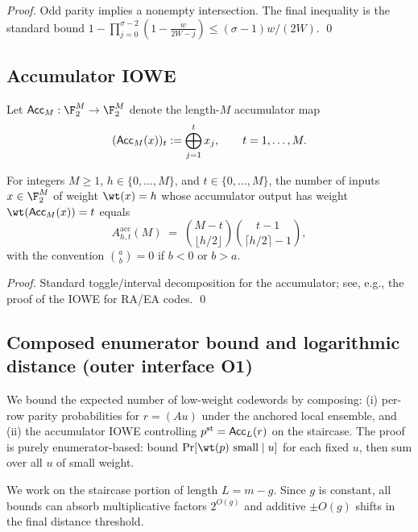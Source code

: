\begin{proof}
Odd parity implies a nonempty intersection. The final inequality is the standard bound
$1-\prod_{j=0}^{\sigma-2}(1-\frac{w}{2W-j})\le (\sigma-1)w/(2W)$. \qed
\end{proof}

\subsection{Accumulator IOWE}
\label{subsec:outer-ea-acc-enum}

Let ${\sf Acc}_M:\F_2^M\to\F_2^M$ denote the length-$M$ accumulator map
\[
({\sf Acc}_M(x))_t := \bigoplus_{j=1}^{t} x_j,\qquad t=1,\dots,M.
\]

\begin{lemma}
\label{lem:acc-iowe}
For integers $M\ge 1$, $h\in\{0,\dots,M\}$, and $t\in\{0,\dots,M\}$,
the number of inputs $x\in\F_2^M$ of weight $\wt(x)=h$ whose accumulator output has weight $\wt({\sf Acc}_M(x))=t$ equals
\[
A^{\mathrm{acc}}_{h,t}(M)
\;=\;
\binom{M-t}{\lfloor h/2\rfloor}\binom{t-1}{\lceil h/2\rceil-1},
\]
with the convention $\binom{a}{b}=0$ if $b<0$ or $b>a$.
\end{lemma}

\begin{proof}
Standard toggle/interval decomposition for the accumulator; see, e.g., the proof of the IOWE for RA/EA codes. \qed
\end{proof}

\subsection{Composed enumerator bound and logarithmic distance (outer interface O1)}
\label{subsec:outer-ea-logdist}

We bound the expected number of low-weight codewords by composing:
(i) per-row parity probabilities for $r=(Au)$ under the anchored local ensemble, and
(ii) the accumulator IOWE controlling $p^{\mathrm{st}}={\sf Acc}_L(r)$ on the staircase.
The proof is purely enumerator-based: bound $\Pr[\wt(p)\ \text{small}\mid u]$ for each fixed $u$, then sum over all $u$ of
small weight.

We work on the staircase portion of length $L=m-g$. Since $g$ is constant, all bounds can absorb
multiplicative factors $2^{O(g)}$ and additive $\pm O(g)$ shifts in the final distance threshold.

